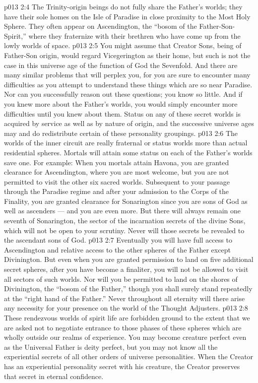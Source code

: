 \vs p013 2:4 \pc The Trinity\hyp{}origin beings do not fully share the Father’s worlds; they have their sole homes on the Isle of Paradise in close proximity to the Most Holy Sphere. They often appear on Ascendington, the “bosom of the Father\hyp{}Son\hyp{}Spirit,” where they fraternize with their brethren who have come up from the lowly worlds of space.
\vs p013 2:5 \pc You might assume that Creator Sons, being of Father\hyp{}Son origin, would regard Vicegerington as their home, but such is not the case in this universe age of the function of God the Sevenfold. And there are many similar problems that will perplex you, for you are sure to encounter many difficulties as you attempt to understand these things which are so near Paradise. Nor can you successfully reason out these questions; you know so little. And if you knew more about the Father’s worlds, you would simply encounter more difficulties until you knew  about them. Status on any of these secret worlds is acquired by service as well as by nature of origin, and the successive universe ages may and do redistribute certain of these personality groupings.
\vs p013 2:6 \pc The worlds of the inner circuit are really fraternal or status worlds more than actual residential spheres. Mortals will attain some status on each of the Father’s worlds save one. For example: When you mortals attain Havona, you are granted clearance for Ascendington, where you are most welcome, but you are not permitted to visit the other six sacred worlds. Subsequent to your passage through the Paradise regime and after your admission to the Corps of the Finality, you are granted clearance for Sonarington since you are sons of God as well as ascenders --- and you are even more. But there will always remain one seventh of Sonarington, the sector of the incarnation secrets of the divine Sons, which will not be open to your scrutiny. Never will those secrets be revealed to the ascendant sons of God.
\vs p013 2:7 Eventually you will have full access to Ascendington and relative access to the other spheres of the Father except Divinington. But even when you are granted permission to land on five additional secret spheres, after you have become a finaliter, you will not be allowed to visit all sectors of such worlds. Nor will you be permitted to land on the shores of Divinington, the “bosom of the Father,” though you shall surely stand repeatedly at the “right hand of the Father.” Never throughout all eternity will there arise any necessity for your presence on the world of the Thought Adjusters.
\vs p013 2:8 These rendezvous worlds of spirit life are forbidden ground to the extent that we are asked not to negotiate entrance to those phases of these spheres which are wholly outside our realms of experience. You may become creature perfect even as the Universal Father is deity perfect, but you may not know all the experiential secrets of all other orders of universe personalities. When the Creator has an experiential personality secret with his creature, the Creator preserves that secret in eternal confidence.
